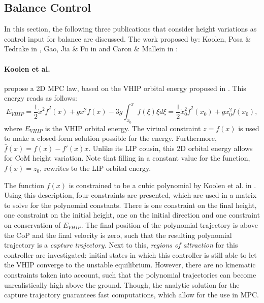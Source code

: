 \subsection{Balance Control}\label{subsec:heightbalance}
In this section, the following three publications that consider height variations as control input for balance are discussed. The work proposed by: Koolen, Posa \& Tedrake in \cite{koolen2016balance},  Gao, Jia \& Fu in \cite{gao2017increase} and  Caron \& Mallein in \cite{caron2018balance}:

\paragraph{Koolen et al.} propose a \ac{2D} \ac{MPC} law, based on the \ac{VHIP} orbital energy proposed in \cite{pratt2007derivation}. This energy reads as follows:
\begin{equation}\label{eq:evhip}
    E_{VHIP}  = \frac{1}{2}\dot{x}^2\bar{f}^2(x)+gx^2f(x) - 3g\int_{x_0}^xf(\xi)\xi d\xi = \frac{1}{2}\dot{x}_0^2\bar{f}^2(x_0)+gx_0^2f(x_0),
\end{equation}
where $E_{VHIP}$ is the \ac{VHIP} orbital energy. The virtual constraint $z=f(x)$ is used to make a closed-form solution possible for the energy. Furthermore, $\bar{f}(x)=f(x)-f'(x)x$. Unlike its \ac{LIP} cousin, this \ac{2D} orbital energy allows for \ac{CoM} height variation. Note that filling in a constant value for the function, $f(x)=z_0$, rewrites to the \ac{LIP} orbital energy.

The function $f(x)$ is constrained to be a cubic polynomial by Koolen et al. in \cite{koolen2016balance}. Using this description, four constraints are presented, which are used in a matrix to solve for the polynomial constants. There is one constraint on the final height, one constraint on the initial height, one on the initial direction and one constraint on conservation of $E_{VHIP}$. The final position of the polynomial trajectory is above the \ac{CoP} and the final velocity is zero, such that the resulting polynomial trajectory is a \textit{capture trajectory}. Next to this, \textit{regions of attraction} for this controller are investigated: initial states in which this controller is still able to let the \ac{VHIP} converge to the unstable equilibrium. However, there are no kinematic constraints taken into account, such that the polynomial trajectories can become unrealistically high above the ground. Though, the analytic solution for the capture trajectory guarantees fast computations, which allow for the use in \ac{MPC}.

